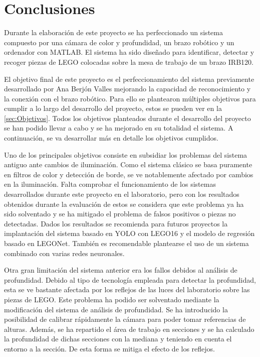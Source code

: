 \chapter{Conclusiones}
\label{chap:Conclusiones}

Durante la elaboración de este proyecto se ha perfeccionado un sistema compuesto por una cámara de color y profundidad, un brazo robótico y un ordenador con MATLAB. El sistema ha sido diseñado para identificar, detectar y recoger piezas de LEGO colocadas sobre la mesa de trabajo de un brazo IRB120.

El objetivo final de este proyecto es el perfeccionamiento del sistema previamente desarrollado por Ana Berjón Valles \citep{TFGAna} mejorando la capacidad de reconocimiento y la conexión con el brazo robótico. Para ello se plantearon múltiples objetivos para cumplir a lo largo del desarrollo del proyecto, estos se pueden ver en la \autoref{sec:Objetivos}. Todos los objetivos planteados durante el desarrollo del proyecto se han podido llevar a cabo y se ha mejorado en su totalidad el sistema. A continuación, se va desarrollar más en detalle los objetivos cumplidos.

Uno de los principales objetivos consiste en subsidiar los problemas del sistema antiguo ante cambios de iluminación. Como el sistema clásico se basa puramente en filtros de color y detección de borde, se ve notablemente afectado por cambios en la iluminación. Falta comprobar el funcionamiento de los sistemas desarrollados durante este proyecto en el laboratorio, pero con los resultados obtenidos durante la evaluación de estos se considera que este problema ya ha sido solventado y se ha mitigado el problema de falsos positivos o piezas no detectadas. Dados los resultados se recomienda para futuros proyectos la implantación del sistema basado en YOLO con LEGO16 y el modelo de regresión basado en LEGONet. También es recomendable plantearse el uso de un sistema combinado con varias redes neuronales.

Otra gran limitación del sistema anterior era los fallos debidos al análisis de profundidad. Debido al tipo de tecnología empleada para detectar la profundidad, esta se ve bastante afectada por los reflejos de las luces del laboratorio sobre las piezas de LEGO. Este problema ha podido ser solventado mediante la modificación del sistema de análisis de profundidad. Se ha introducido la posibilidad de calibrar rápidamente la cámara para poder tomar referencias de alturas. Además, se ha repartido el área de trabajo en secciones y se ha calculado la profundidad de dichas secciones con la mediana y teniendo en cuenta el entorno a la sección. De esta forma se mitiga el efecto de los reflejos.

